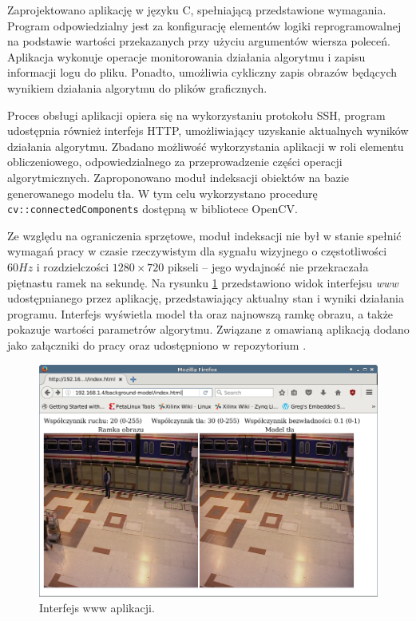 Zaprojektowano aplikację w języku C, spełniającą przedstawione wymagania.
Program odpowiedzialny jest za konfigurację elementów logiki reprogramowalnej na podstawie wartości przekazanych przy użyciu argumentów wiersza poleceń. 
Aplikacja wykonuje operacje monitorowania działania algorytmu i zapisu informacji logu do pliku. %
Ponadto, umożliwia cykliczny zapis obrazów będących wynikiem działania algorytmu do plików graficznych. 

Proces obsługi aplikacji opiera się na wykorzystaniu protokołu SSH, program udostępnia również interfejs HTTP, umożliwiający uzyskanie aktualnych wyników działania algorytmu.
Zbadano możliwość wykorzystania aplikacji w roli elementu obliczeniowego, odpowiedzialnego za przeprowadzenie części operacji algorytmicznych. %
Zaproponowano moduł indeksacji obiektów na bazie generowanego modelu tła. 
W tym celu wykorzystano procedurę \texttt{cv::connectedComponents} dostępną w bibliotece OpenCV. %

Ze względu na ograniczenia sprzętowe, moduł indeksacji nie był w stanie spełnić wymagań pracy w czasie rzeczywistym dla sygnału wizyjnego o częstotliwości $60Hz$ i rozdzielczości $1280 \times 720 $ pikseli -- jego wydajność nie przekraczała piętnastu ramek na sekundę.
Na rysunku \ref{fig:background-buffer-www} przedstawiono widok interfejsu \emph{www} udostępnianego przez aplikację, przedstawiający aktualny stan i wyniki działania programu. Interfejs wyświetla model tła oraz najnowszą ramkę obrazu, a także pokazuje wartości parametrów algorytmu.
Związane z omawianą aplikacją dodano jako załączniki do pracy oraz udostępniono w repozytorium \cite{git-repository}.
\begin{figure}[!htb]
	\centering
	\includegraphics[width=12cm]{img/www-iface.png}
	\caption{Interfejs www aplikacji.}
	\label{fig:background-buffer-www}
\end{figure}

